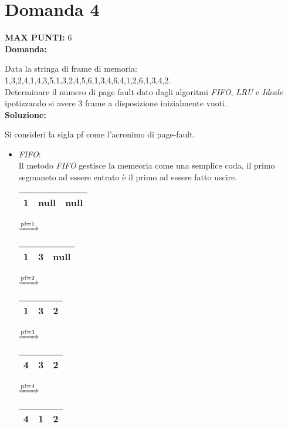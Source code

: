 \documentclass{article}
\begin{document}
    \section*{Domanda 4}
    \textbf{MAX PUNTI:} 6\\
    \textbf{Domanda:}


    Data la stringa di frame di memoria: 1,3,2,4,1,4,3,5,1,3,2,4,5,6,1,3,4,6,4,1,2,6,1,3,4,2.\\
    Determinare il numero di page fault dato dagli algoritmi \emph{FIFO}, \emph{LRU} e \emph{Ideale} ipotizzando si avere 3 frame a disposizione inizialmente vuoti.\\
    \textbf{Soluzione:}


    Si consideri la sigla pf come l'acronimo di page-fault.
    \begin{itemize}
        \item \emph{FIFO}:\\
            Il metodo \emph{FIFO} gestisce la memeoria come una semplice coda, il primo segmaneto ad essere entrato è il primo ad essere fatto uscire.\\
            \begin{tabular}{|c|c|c|}
                \hline
                1 & null & null\\
                \hline
            \end{tabular}
            $\xRightarrow{\text{pf}=1}$
            \begin{tabular}{|c|c|c|}
                \hline
                    1 & 3 & null\\
                \hline
            \end{tabular}
            $\xRightarrow{\text{pf}=2}$
            \begin{tabular}{|c|c|c|}
                \hline
                1 & 3 & 2\\
                \hline
            \end{tabular}
            $\xRightarrow{\text{pf}=3}$
            \begin{tabular}{|c|c|c|}
                \hline
                4 & 3 & 2\\
                \hline
            \end{tabular}
            $\xRightarrow{\text{pf}=4}$
            \begin{tabular}{|c|c|c|}
                \hline
                4 & 1 & 2\\
                \hline
            \end{tabular}

\end{itemize}
\end{document}
